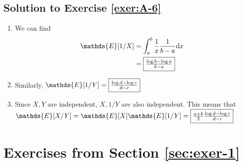 \documentclass[12pt]{book}
\numberwithin{equation}{chapter}
\theoremstyle{plain}
\numberwithin{theorem}{section}
\theoremstyle{definition}
\numberwithin{exercise}{chapter}
\newcommand{\<}{\langle}
\renewcommand{\>}{\rangle}
\renewcommand{\(}{\left(}
\renewcommand{\)}{\right)}
\renewcommand{\[}{\left[}
\renewcommand{\]}{\right]}
\newcommand\Eb{\mathds{E}}
\newcommand\dd{\mathrm{d}}
\theoremstyle{definition}
\numberwithin{question}{section}
\begin{document}
\subsection*{Solution to Exercise \ref{exer:A-6}}

\begin{enumerate}
    \item We can find
    \begin{align}
        \Eb[1/X] & = \int_{a}^b \frac{1}{x} \frac{1}{b-a} \dd x \\
        {} & = \fbox{$\frac{\log b - \log a}{b - a}$}
    \end{align}
    \item Similarly, $\Eb[1/Y] = \fbox{$\frac{\log d - \log c}{d - c}$} $
    \item Since $X,Y$ are independent, $X,1/Y$ are also independent. This means that $\Eb[X/Y] = \Eb[X]\Eb[1/Y] = \fbox{$\frac{a+b}{2} \frac{\log d - \log c}{d - c}$}$
\end{enumerate}


\clearpage
\section{Exercises from Section \ref{sec:exer-1}}



\end{document}
